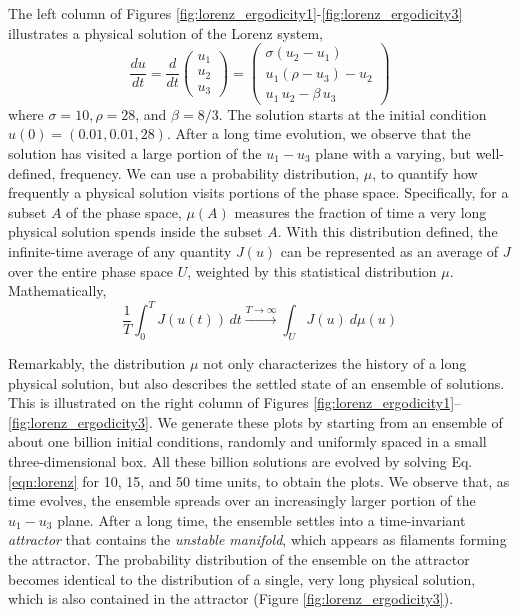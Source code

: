 \documentclass[preprint,12pt]{elsarticle}
\begin{document}
The left column of Figures \ref{fig:lorenz_ergodicity1}-\ref{fig:lorenz_ergodicity3}
illustrates a physical solution of the Lorenz system,
\begin{equation}
\label{eqn:lorenz}
\frac{du}{dt} =
    \frac{d}{dt}\begin{pmatrix}u_1\\u_2\\u_3\end{pmatrix} =
    \begin{pmatrix}
        \sigma (u_2-u_1) \\
        u_1(\rho -u_3) - u_2 \\
        u_1\,u_2 - \beta\,u_3
\end{pmatrix}
\end{equation}
where $\sigma=10,\rho=28$, and $\beta=8/3$.  The solution starts at the initial
condition $u(0)=(0.01, 0.01, 28)$.  After a long time evolution, we observe that
the solution has visited a large portion of the $u_1-u_3$ plane with a varying, but well-defined, frequency.  We can use a probability distribution, $\mu$, to quantify
how frequently a physical solution visits portions of the phase space.
Specifically, for a subset $A$ of the phase space, $\mu(A)$ measures the
fraction of time a very long physical solution spends inside the subset $A$.
With this distribution defined, the infinite-time average of any quantity $J(u)$ can be represented as an average of $J$ over the entire phase space $U$, weighted
by this statistical distribution $\mu$.  Mathematically,
\begin{equation}
    \frac1T \int_0^T J(u(t))\,dt \xrightarrow{T\to\infty}
    \int_U J(u)\: d\mu(u)
\end{equation}

Remarkably, the distribution $\mu$ not only characterizes the history of
a long physical solution, but also describes the settled state of
an ensemble of solutions.
This is illustrated on the right column of Figures \ref{fig:lorenz_ergodicity1}--\ref{fig:lorenz_ergodicity3}.
We generate these plots by starting from an ensemble of about one billion initial
conditions, randomly and uniformly spaced in a small three-dimensional box.  All these billion solutions are evolved by solving Eq. \ref{eqn:lorenz} for 10, 15, and 50 time units, to obtain the plots. 
We observe that, as time evolves, the ensemble spreads over an increasingly
larger portion of the $u_1-u_3$ plane. After a long time, the ensemble settles into a time-invariant \emph{attractor} that contains the \emph{unstable manifold}, which appears as filaments forming the attractor. The probability distribution of the ensemble on the attractor becomes identical to the distribution of a single, very long physical
solution, which is also contained in the attractor (Figure \ref{fig:lorenz_ergodicity3}).
\end{document}
